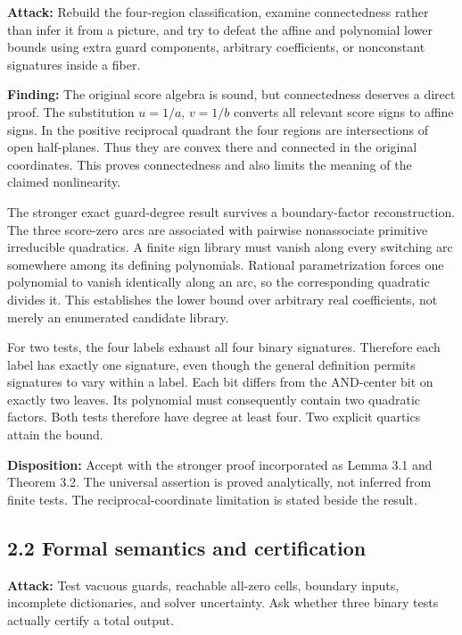 \documentclass[
  11pt,
]{article}
\begin{document}
\textbf{Attack:} Rebuild the four-region classification, examine
connectedness rather than infer it from a picture, and try to defeat the
affine and polynomial lower bounds using extra guard components,
arbitrary coefficients, or nonconstant signatures inside a fiber.

\textbf{Finding:} The original score algebra is sound, but connectedness
deserves a direct proof. The substitution \(u=1/a\), \(v=1/b\) converts
all relevant score signs to affine signs. In the positive reciprocal
quadrant the four regions are intersections of open half-planes. Thus
they are convex there and connected in the original coordinates. This
proves connectedness and also limits the meaning of the claimed
nonlinearity.

The stronger exact guard-degree result survives a boundary-factor
reconstruction. The three score-zero arcs are associated with pairwise
nonassociate primitive irreducible quadratics. A finite sign library
must vanish along every switching arc somewhere among its defining
polynomials. Rational parametrization forces one polynomial to vanish
identically along an arc, so the corresponding quadratic divides it.
This establishes the lower bound over arbitrary real coefficients, not
merely an enumerated candidate library.

For two tests, the four labels exhaust all four binary signatures.
Therefore each label has exactly one signature, even though the general
definition permits signatures to vary within a label. Each bit differs
from the AND-center bit on exactly two leaves. Its polynomial must
consequently contain two quadratic factors. Both tests therefore have
degree at least four. Two explicit quartics attain the bound.

\textbf{Disposition:} Accept with the stronger proof incorporated as
Lemma 3.1 and Theorem 3.2. The universal assertion is proved
analytically, not inferred from finite tests. The reciprocal-coordinate
limitation is stated beside the result.

\subsection{2.2 Formal semantics and
certification}\label{formal-semantics-and-certification}

\textbf{Attack:} Test vacuous guards, reachable all-zero cells, boundary
inputs, incomplete dictionaries, and solver uncertainty. Ask whether
three binary tests actually certify a total output.
\end{document}
